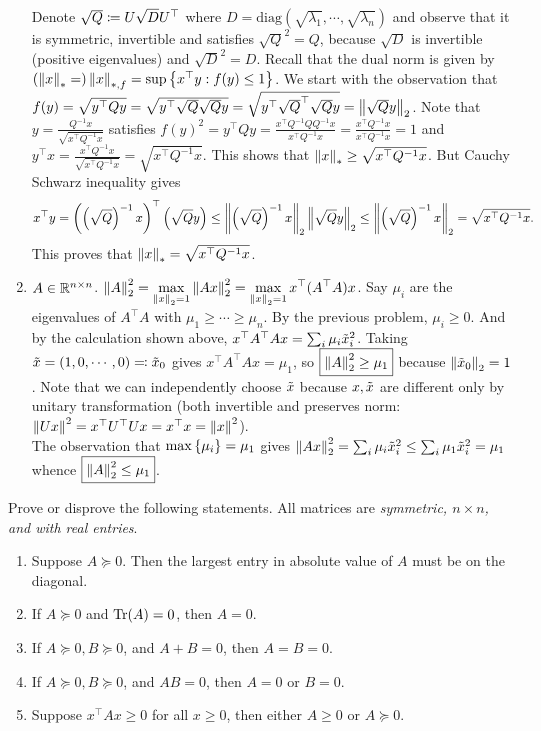 \begin{enumerate}[leftmargin=*]
Denote $\sqrt{Q}\coloneqq U \sqrt D U^\top$ where $D=\text{diag}(\sqrt{\lambda_1},\cdots,\sqrt{\lambda_n})$ and observe that it is symmetric, invertible and satisfies $\sqrt Q^2 = Q$, because $\sqrt{D}$ is invertible (positive eigenvalues) and $\sqrt D^2=D$.
Recall that the dual norm is given by $\left(\left\lVert x \right\rVert_{*}=\right)\left\lVert x \right\rVert_{*,f} = \sup\left\{x^\top y : f(y)\leq 1\right\}$. We start with the observation that $f(y) = \sqrt{y^\top Q y} = \sqrt{y^\top \sqrt Q \sqrt Q y} = \sqrt{y^\top \sqrt Q^\top \sqrt Q y} = \left\lVert \sqrt Qy \right\rVert_{2}$. 
Note that $y=\frac{Q^{-1}x}{\sqrt{x^\top Q^{-1}x}}$ satisfies $f(y)^2 = y^\top Q y = \frac{x^\top Q^{-1} Q Q^{-1}x}{x^\top Q^{-1}x} = \frac{x^\top Q^{-1}x}{x^\top Q^{-1}x} = 1$ and $y^\top x= \frac{x^\top Q^{-1}x}{\sqrt{x^\top Q^{-1}x}} = \sqrt{x^\top Q^{-1}x}$. This shows that $\left\lVert x \right\rVert_{*} \geq \sqrt{x^\top Q^{-1}x}$. But Cauchy Schwarz inequality gives 
$$x^\top y = \left(\left(\sqrt Q\right)^{-1} x\right)^\top\left(\sqrt Qy\right)\leq \left\lVert \left(\sqrt Q\right)^{-1}x \right\rVert_{2}\left\lVert \sqrt Qy \right\rVert_{2} \leq \left\lVert \left(\sqrt Q\right)^{-1}x \right\rVert_{2}=\sqrt{x^\top Q^{-1}x}.$$ This proves that $\left\lVert x \right\rVert_{*} = \sqrt{x^\top Q^{-1}x}$.

\item $A\in\mathbb{R}^{n\times n}$. $\displaystyle\left\lVert A \right\rVert_{2} ^2 = \max_{\left\lVert x \right\rVert_{2} = 1}\left\lVert Ax \right\rVert_{2}^2 = \max_{\left\lVert x \right\rVert_{2} = 1} x^\top (A^\top A)x$. Say $\mu_i$ are the eigenvalues of $A^\top A$ with $\mu_1\geq\cdots\geq \mu_n$. By the previous problem, $\mu_i\geq 0$. And by the calculation shown above, $x^\top A^\top Ax = \sum_i\mu_i{\tilde{x}}_i^2$. Taking ${\tilde{x}} = (1,0,\cdots,0) \eqqcolon {\tilde{x}}_0$ gives $x^\top A^\top Ax = \mu_1$, so $\boxed{\left\lVert A \right\rVert_{2} ^2 \ge \mu_1}$ because $\left\lVert {\tilde{x}}_0 \right\rVert_{2}=1$. Note that we can independently choose ${\tilde{x}}$ because $x,{\tilde{x}}$ are different only by unitary transformation (both invertible and preserves norm: $\left\lVert Ux \right\rVert_{}^2 = x^\top U^\top U x = x^\top x = \left\lVert x \right\rVert_{}^2$).
\\
The observation that $\max\left\{\mu_i\right\}=\mu_1$ gives $\left\lVert Ax \right\rVert_{2}^2 = \sum_i\mu_i{\tilde{x}}_i^2 \leq \sum_i \mu_1 {\tilde{x}}_i^2 = \mu_1$ whence $\boxed{\left\lVert A \right\rVert_{2} ^2 \leq \mu_1}$.
\end{enumerate}













\newpage
\pb
Prove or disprove the following statements. All matrices are \textit{symmetric, $n \times n$, and with real entries}.
\begin{enumerate}[leftmargin=*]
\item Suppose $A \succeq 0$. Then the largest entry in absolute value of $A$ must be on the diagonal.
\item If $A \succeq 0$ and $\operatorname{Tr}(A) = 0$, then $A = 0$.
\item If $A \succeq 0, B \succeq 0$, and $A + B = 0$, then $A = B = 0$.
\item If $A \succeq 0, B \succeq 0$, and $AB = 0$, then $A = 0$ or $B = 0$.
\item Suppose $x^\top Ax\ge0$ for all $x\ge0$, then either $A\ge0$ or $A\succeq0$. \end{enumerate}
\soln 

